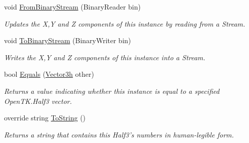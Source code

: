 \begin{DoxyCompactItemize}
void \hyperlink{struct_open_t_k_1_1_vector3h_a7b3ee8aa56680cbc9a63225889e45ae7}{From\-Binary\-Stream} (Binary\-Reader bin)
\begin{DoxyCompactList}\small\item\em Updates the X,Y and Z components of this instance by reading from a Stream.\end{DoxyCompactList}\item 
void \hyperlink{struct_open_t_k_1_1_vector3h_a7bc89e7ee7e1a6098d7a8817610d53b8}{To\-Binary\-Stream} (Binary\-Writer bin)
\begin{DoxyCompactList}\small\item\em Writes the X,Y and Z components of this instance into a Stream.\end{DoxyCompactList}\item 
bool \hyperlink{struct_open_t_k_1_1_vector3h_a54d54e572541a14736ea97c0c4786170}{Equals} (\hyperlink{struct_open_t_k_1_1_vector3h}{Vector3h} other)
\begin{DoxyCompactList}\small\item\em Returns a value indicating whether this instance is equal to a specified Open\-T\-K.\-Half3 vector.\end{DoxyCompactList}\item 
override string \hyperlink{struct_open_t_k_1_1_vector3h_a528fb170e3b5a3b28c9750d2e704ac3d}{To\-String} ()
\begin{DoxyCompactList}\small\item\em Returns a string that contains this Half3's numbers in human-\/legible form.\end{DoxyCompactList}\end{DoxyCompactItemize}
